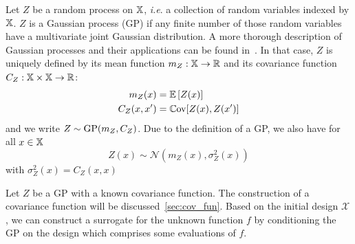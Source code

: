 \documentclass[../../Main_ManuscritThese.tex]{subfiles}
\begin{document}
\begin{definition}
  Let $Z$ be a random process on $\mathbb{X}$, \textit{i.e}. a collection of random variables indexed by $\mathbb{X}$. $Z$ is a Gaussian process (GP) if any finite number of those random variables have a multivariate joint Gaussian distribution.  A more thorough description of Gaussian processes and their applications can be found in~\cite{rasmussen_gaussian_2006}.
  In that case, $Z$ is uniquely defined by its mean function $m_Z:\mathbb{X} \rightarrow \mathbb{R}$ and its covariance function $C_Z:\mathbb{X} \times \mathbb{X} \rightarrow \mathbb{R}$:
  \begin{align}
    m_Z(x) &= \mathbb{E}\left[Z(x)\right] \\
    C_Z(x, x^{\prime}) &= \mathbb{C}\mathrm{ov}[Z(x), Z(x^{\prime})]
  \end{align}
  and we write $Z \sim \operatorname{\mathrm{GP}}(m_Z, C_Z)$.
  Due to the definition of a GP, we also have for all $x\in \mathbb{X}$
  \begin{equation}
    Z(x) \sim \mathcal{N}(m_Z(x), \sigma^2_Z(x)) 
  \end{equation}
  with $\sigma_Z^2(x) = C_Z(x, x)$
\end{definition}

Let $Z$ be a GP with a known covariance function. The construction of a covariance function will be discussed~\cref{sec:cov_fun}.
Based on the initial design $\mathcal{X}$, we can construct a surrogate for the unknown function $f$ by conditioning the GP on the design which comprises some evaluations of $f$.   
\end{document}
